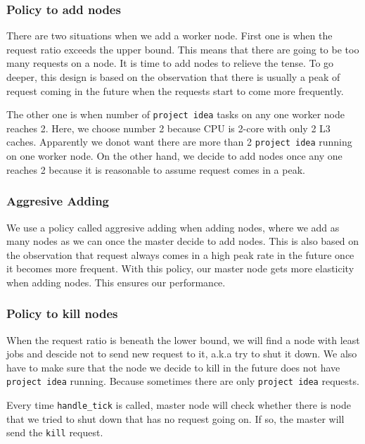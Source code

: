 \documentclass[11pt]{article}
\newcommand{\code}[1]{\texttt{#1}}
\begin{document}
\subsubsection{Policy to add nodes} %
\label{ssub:policy_to_add_nodes}
There are two situations when we add a worker node. First one is when the request ratio exceeds the upper bound.
This means that there are going to be too many requests on a node.
It is time to add nodes to relieve the tense.
To go deeper, this design is based on the observation that there is usually a peak of request coming in the future when the requests start to come more frequently.

The other one is when number of \code{project idea} tasks on any one worker node reaches 2.
Here, we choose number 2 because CPU is 2-core with only 2 L3 caches.
Apparently we donot want there are more than 2 \code{project idea} running on one worker node.
On the other hand, we decide to add nodes once any one reaches 2 because it is reasonable to assume request comes in a peak.

\subsubsection{Aggresive Adding} %
\label{ssub:aggresive_adding}
We use a policy called aggresive adding when adding nodes, where we add as many nodes as we can once the master decide to add nodes.
This is also based on the observation that request always comes in a high peak rate in the future once it becomes more frequent.
With this policy, our master node gets more elasticity when adding nodes.
This ensures our performance.

\subsubsection{Policy to kill nodes} %
\label{ssub:policy_to_kill_nodes}
When the request ratio is beneath the lower bound, we will find a node with least jobs and descide not to send new request to it, a.k.a try to shut it down.
We also have to make sure that the node we decide to kill in the future does not have \code{project idea} running.
Because sometimes there are only \code{project idea} requests.

Every time \code{handle\_tick} is called, master node will check whether there is node that we tried to shut down that has no request going on.
If so, the master will send the \code{kill} request.
\end{document}
